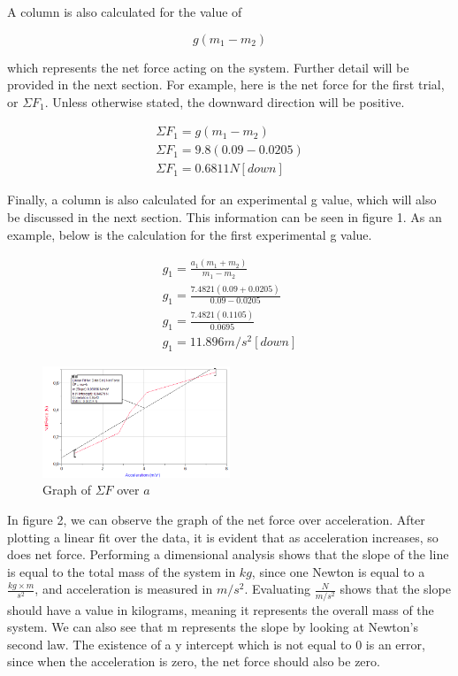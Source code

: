 \documentclass[10pt,twocolumn,letterpaper]{article}
\begin{document}
A column is also calculated for the value of

\begin{equation}
    g(m_{1} - m_{2})
\end{equation}

which represents the net force acting on the system. Further detail will be provided in the next section. For example, here is the net force for the first trial, or \(\Sigma F_{1}\). Unless otherwise stated, the downward direction will be positive. 

\begin{align}
    \nonumber \Sigma F_{1}=g(m_{1} - m_{2}) \\
    \nonumber \Sigma F_{1}=9.8(0.09 - 0.0205) \\
    \nonumber \Sigma F_{1}=0.6811 N [down]
\end{align}

Finally, a column is also calculated for an experimental g value, which will also be discussed in the next section. This information can be seen in figure 1. As an example, below is the calculation for the first experimental g value.

\begin{align}
    \nonumber g_{1} = \frac{a_{1}(m_{1} + m_{2})}{m_{1} - m_{2}} \\
    \nonumber g_{1} = \frac{7.4821(0.09 + 0.0205)}{0.09 - 0.0205} \\
    \nonumber g_{1} = \frac{7.4821(0.1105)}{0.0695} \\
    \nonumber g_{1} = 11.896 m/s^2 [down]
\end{align}

\begin{figure}
    \centering
    \includegraphics[width=0.5\textwidth]{figures/LoggerPro_BcEtDfO5aS.png}
    \caption{Graph of \(\Sigma F\) over \(a\)}
    \label{fig:enter-label}
\end{figure}

In figure 2, we can observe the graph of the net force over acceleration. After plotting a linear fit over the data, it is evident that as acceleration increases, so does net force. Performing a dimensional analysis shows that the slope of the line is equal to the total mass of the system in \(kg\), since one Newton is equal to a \(\frac{kg\times m}{s^2}\), and acceleration is measured in \(m/s^2\). Evaluating \(\frac{N}{m/s^2}\) shows that the slope should have a value in kilograms, meaning it represents the overall mass of the system. We can also see that m represents the slope by looking at Newton's second law.
The existence of a y intercept which is not equal to 0 is an error, since when the acceleration is zero, the net force should also be zero. 
\end{document}
